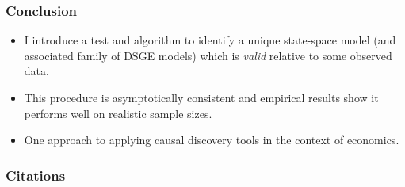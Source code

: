 \documentclass{beamer}
\begin{document}
\begin{frame}
    \frametitle{Conclusion}
    \begin{itemize}
        \item I introduce a test and algorithm to identify a unique state-space model (and associated family of DSGE models) which is \textit{valid} relative to some observed data.
        \item This procedure is asymptotically consistent and empirical results show it performs well on realistic sample sizes.
        \item One approach to applying causal discovery tools in the context of economics.
    \end{itemize}
\end{frame}

\begin{frame}
    \frametitle{Citations}
    \printbibliography
\end{frame}
\end{document}
